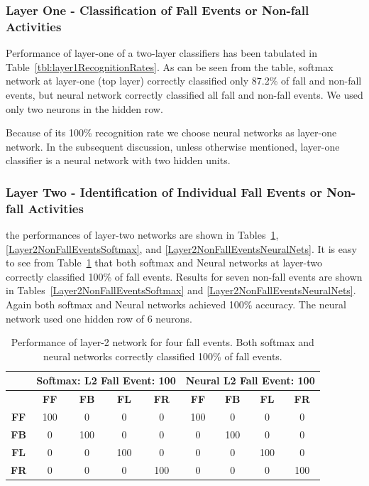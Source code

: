 \documentclass[]{IEEEtran}
\begin{document}
\subsubsection{Layer One - Classification of Fall Events or Non-fall Activities
} \label{sec:LayerOneFallAndNonFallIdentification}

Performance of layer-one of a two-layer classifiers has been tabulated in
Table~\ref{tbl:layer1RecognitionRates}. As can be seen from the table, softmax
network at layer-one (top layer) correctly classified only 87.2\% of fall and
non-fall events, but neural network correctly classified all fall and non-fall
events. We used only two neurons in the hidden row.  \par Because of its 100\%
recognition rate we choose neural networks as layer-one network. In the
subsequent discussion, unless otherwise mentioned,  layer-one classifier is a
neural network with two hidden units.


\subsubsection{Layer Two - Identification of Individual Fall Events or Non-fall
Activities} \label{sec:LayerTwoFallOrNonFallEventIdentification}

the performances of layer-two networks are shown in
Tables~\ref{Layer2FallEvents}, \ref{Layer2NonFallEventsSoftmax}, and
\ref{Layer2NonFallEventsNeuralNets}. It is easy to see from
Table~\ref{Layer2FallEvents} that both softmax and Neural networks at layer-two
correctly classified 100\% of fall events.  Results for seven non-fall events
are shown in Tables~\ref{Layer2NonFallEventsSoftmax} and
\ref{Layer2NonFallEventsNeuralNets}. Again both softmax and Neural networks
achieved 100\% accuracy. The neural network used one hidden row of 6 neurons.
\begin{table}[htb]
\resizebox{\columnwidth}{!}
{
\begin{tabular}{|c|c|c|c|c||c|c|c|c|}
\hline 
& \multicolumn{4}{c||}{\bf Softmax: L2 Fall Event: 100} & \multicolumn{4}{c|}{\bf Neural 
L2 Fall Event: 100} \\ \hline
& \textbf{FF} & \textbf{FB}  & \textbf{FL} & \textbf{FR} & \textbf{FF} & \textbf{FB}  & 
\textbf{FL} & \textbf{FR} \\ \hline
\textbf{FF} & 100 &  0 &  0 &  0  & 100 &  0 &  0 &  0\\ \hline
\textbf{FB} & 0 &  100 &  0 &  0  & 0 &  100 &  0 &  0\\ \hline
\textbf{FL} & 0 &  0 &  100 &  0  & 0 &  0 &  100 &  0\\ \hline
\textbf{FR} & 0 &  0 &  0 &  100  & 0 &  0 &  0 &  100 \\ \hline
\end{tabular}
}
\caption{ Performance of layer-2 network for  four fall events. Both softmax
and neural networks correctly classified 100\% of fall events.}
\label{Layer2FallEvents}
\end{table}
\end{document}
